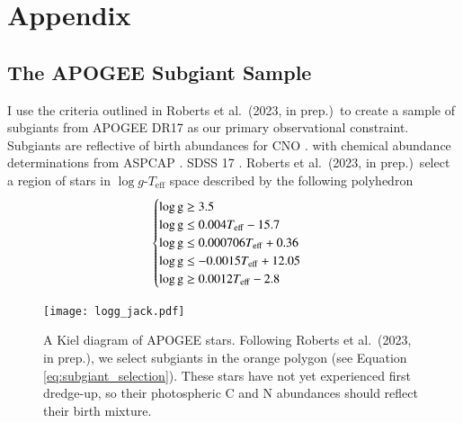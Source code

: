 \documentclass[12pt,oneside]{report}
\newcommand{\citetjack}{Roberts et al.~(2023, in prep.)}
\begin{document}

\newpage

 



\appendix
\chapter*{Appendix}
\renewcommand{\thesection}{A.\arabic{section}}
\renewcommand\thefigure{A\arabic{figure}}    
\renewcommand\theequation{A\arabic{equation}}    
\setcounter{figure}{0}
\setcounter{equation}{0}



\section{The APOGEE Subgiant Sample}\label{sec:jack}

I use the criteria outlined in \citetjack~to create a sample of subgiants from APOGEE DR17 \cite{apogee17} as our primary observational constraint. Subgiants are reflective of birth abundances for CNO \citep{souto19}. with chemical abundance determinations from ASPCAP \citep{aspcap}. SDSS 17 \cite{sdss17}.
\citetjack~select a region of stars in $\log g$-$T_\text{eff}$ space described by the following polyhedron
\begin{equation}
    \begin{cases} \label{eq:subgiant_selection}
        \log \text{g} \geq 3.5 \\
        \log \text{g} \leq 0.004T_{\rm eff} - 15.7 \\
        \log \text{g} \leq 0.000706T_{\rm eff} + 0.36 \\
        \log \text{g} \leq -0.0015T_{\rm eff} + 12.05 \\
        \log \text{g} \geq 0.0012T_{\rm eff} - 2.8 \\
    \end{cases}
\end{equation}

\begin{figure}
    \centering
    \texttt{[image: logg\_jack.pdf]}
    \caption[Subgiant selection]{
        A Kiel diagram of APOGEE stars. Following \citetjack, we select subgiants in the orange polygon (see Equation \ref{eq:subgiant_selection}). These stars have not yet experienced first dredge-up, so their photospheric C and N abundances should reflect their birth mixture.
    }
\end{figure}
\end{document}
